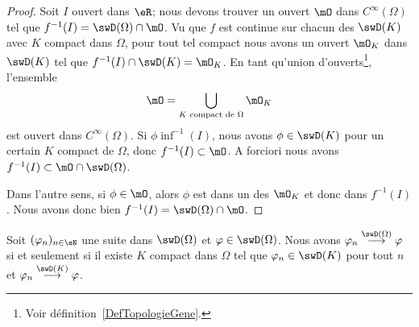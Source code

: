 \begin{proof}
    Soit \( I\) ouvert dans \( \eR\); nous devons trouver un ouvert \( \mO\) dans \(  C^{\infty}(\Omega)\) tel que \( f^{-1}(I)=\swD(\Omega)\cap\mO\). Vu que \( f\) est continue sur chacun des \( \swD(K)\) avec \( K\) compact dans \( \Omega\), pour tout tel compact nous avons un ouvert \( \mO_K\) dans \( \swD(K)\) tel que \( f^{-1}(I)\cap \swD(K)=\mO_K\). En tant qu'union d'ouverts\footnote{Voir définition~\ref{DefTopologieGene}.}, l'ensemble
    \begin{equation}
        \mO=\bigcup_{ K\text{ compact de } \Omega}\mO_K
    \end{equation}
    est ouvert dans \(  C^{\infty}(\Omega)\). Si \( \phi\inf^{-1}(I)\), nous avons \( \phi\in\swD(K)\) pour un certain \( K\) compact de \( \Omega\), donc \( f^{-1}(I)\subset\mO\). A forciori nous avons \( f^{-1}(I)\subset\mO\cap\swD(\Omega)\).

    Dans l'autre sens, si \( \phi\in\mO\), alors \( \phi\) est dans un des \( \mO_K\) et donc dans \( f^{-1}(I)\). Nous avons donc bien \( f^{-1}(I)=\swD(\Omega)\cap \mO\).
\end{proof}

\begin{theorem}       \label{ThoXYADBZr}
    Soit \( (\varphi_n)_{n\in \eN}\) une suite dans \( \swD(\Omega)\) et \( \varphi\in\swD(\Omega)\). Nous avons \( \varphi_n\stackrel{\swD(\Omega)}{\longrightarrow}\varphi\) si et seulement si il existe \( K\) compact dans \( \Omega\) tel que \( \varphi_n\in\swD(K)\) pour tout \( n\) et \( \varphi_n\stackrel{\swD(K)}{\longrightarrow}\varphi\).
\end{theorem}


